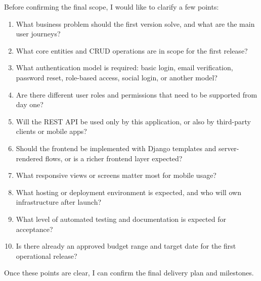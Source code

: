 \documentclass[11pt,a4paper]{article}
\begin{document}
Before confirming the final scope, I would like to clarify a few points:\par

\begin{enumerate}
\item What business problem should the first version solve, and what are the main user journeys?
\item What core entities and CRUD operations are in scope for the first release?
\item What authentication model is required: basic login, email verification, password reset, role-based access, social login, or another model?
\item Are there different user roles and permissions that need to be supported from day one?
\item Will the REST API be used only by this application, or also by third-party clients or mobile apps?
\item Should the frontend be implemented with Django templates and server-rendered flows, or is a richer frontend layer expected?
\item What responsive views or screens matter most for mobile usage?
\item What hosting or deployment environment is expected, and who will own infrastructure after launch?
\item What level of automated testing and documentation is expected for acceptance?
\item Is there already an approved budget range and target date for the first operational release?
\end{enumerate}

Once these points are clear, I can confirm the final delivery plan and milestones.\par
\end{document}
